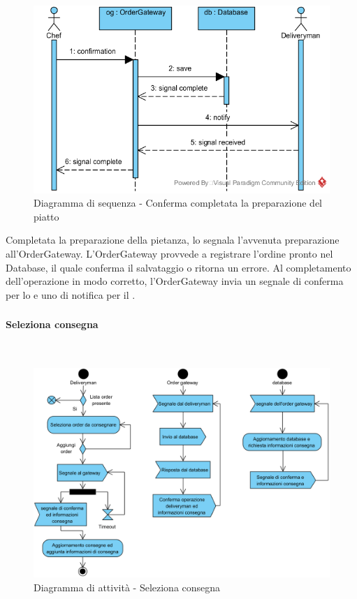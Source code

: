 \begin{figure}[H]
	\centering
	\includegraphics[width=14cm]{diagrammi_img/sequenza/cuoco_piatto_pronto.png}
	\caption{Diagramma di sequenza - Conferma completata la preparazione del piatto}
\end{figure}
Completata la preparazione della pietanza, lo \Chef{} segnala l'avvenuta preparazione all'Order\-Gateway. L'Order\-Gateway provvede a registrare l'ordine pronto nel Database, il quale conferma il salvataggio o ritorna un errore. Al completamento dell'operazione in modo corretto, l'Order\-Gateway invia un segnale di conferma per lo \Chef{} e uno di notifica per il \Deliveryman{}.

\subsubsection{\Deliveryman{}}

\paragraph{Seleziona consegna}\mbox{}\\
\nopagebreak
\begin{figure}[H]
	\centering
	\includegraphics[width=14cm]{diagrammi_img/attivita/deliveryman_seleziona.png}
	\caption{Diagramma di attività - Seleziona consegna}
\end{figure}


